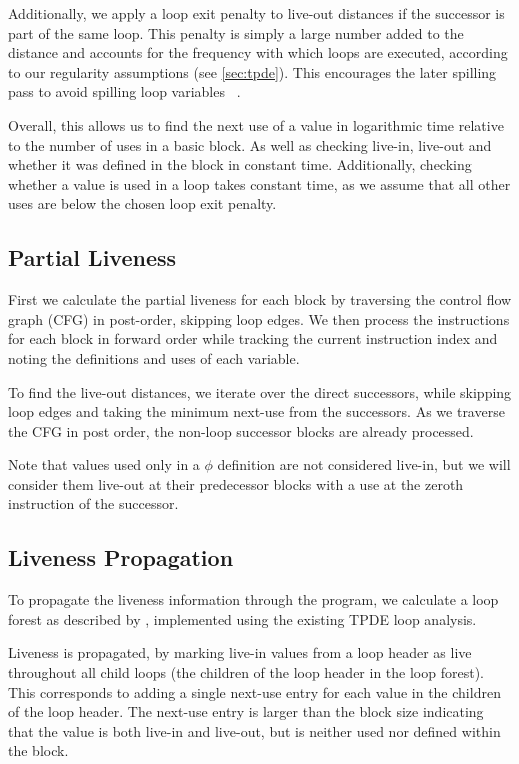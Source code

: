 Additionally, we apply a loop exit penalty to live-out distances if the successor is part of the same loop. This penalty is simply a large number added to the distance and accounts for the frequency with which loops are executed, according to our regularity assumptions  (see \autoref{sec:tpde}).  This encourages the later spilling pass to avoid spilling loop variables ~\cite{hack-spilling}.

Overall, this allows us to find the next use of a value in logarithmic time relative to the number of uses in a basic block. As well as checking live-in, live-out and whether it was defined in the block in constant time. Additionally, checking whether a value is used in a loop takes constant time, as we assume that all other uses are below the chosen loop exit penalty. 

\subsection{Partial Liveness}

First we calculate the partial liveness for each block by traversing the control flow graph (CFG) in post-order, skipping loop edges. 
We then process the instructions for each block in forward order while tracking the current instruction index and noting the definitions and uses of each variable.

To find the live-out distances, we iterate over the direct successors, while skipping loop edges and taking the minimum next-use from the successors. As we traverse the CFG in post order, the non-loop successor blocks are already processed.

Note that values used only in a $\phi$ definition are not considered live-in, but we will consider them live-out at their predecessor blocks with a use at the zeroth instruction of the successor.


\subsection{Liveness Propagation}

To propagate the liveness information through the program, we calculate a loop forest as described by \autocite{fast-liveness},  implemented using the existing TPDE loop analysis.


Liveness is propagated, by marking live-in values from a loop header as live throughout all child loops (the children of the loop header in the loop forest). This corresponds to adding a single next-use entry for each value in the children of the loop header.
The next-use entry is larger than the block size indicating that the value is both live-in and live-out, but is neither used nor defined within the block.

